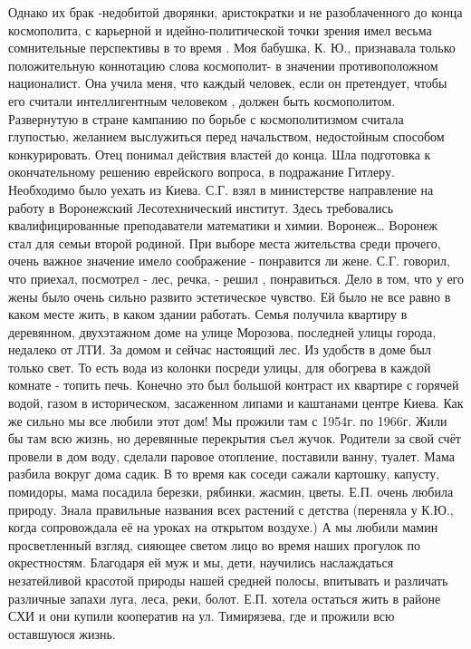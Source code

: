 Однако их брак -недобитой дворянки, аристократки и не разоблаченного до конца космополита, с карьерной и идейно-политической точки зрения имел весьма сомнительные перспективы в то время . Моя бабушка, К. Ю., признавала только положительную коннотацию слова космополит- в значении противоположном националист. Она учила меня, что каждый человек, если он претендует, чтобы его считали интеллигентным человеком , должен быть космополитом. Развернутую в стране кампанию по борьбе с космополитизмом считала глупостью, желанием выслужиться перед начальством, недостойным способом конкурировать. Отец понимал действия властей до конца. Шла подготовка к окончательному решению еврейского вопроса, в подражание Гитлеру. Необходимо было уехать из Киева. С.Г. взял в министерстве направление на работу в Воронежский Лесотехнический институт. Здесь требовались квалифицированные преподаватели математики и химии.
Воронеж…
Воронеж стал для семьи второй родиной. При выборе места жительства среди прочего, очень важное значение имело соображение - понравится ли жене. С.Г. говорил, что приехал, посмотрел - лес, речка, - решил , понравиться. Дело в том, что у его жены было очень сильно развито эстетическое чувство. Ей было не все равно в каком месте жить, в каком здании работать.
Семья получила квартиру в деревянном, двухэтажном доме на улице Морозова, последней улицы города, недалеко от ЛТИ. За домом и сейчас настоящий лес. Из удобств в доме был только свет. То есть вода из колонки посреди улицы, для обогрева в каждой комнате - топить печь. Конечно это был большой контраст их квартире с горячей водой, газом в историческом, засаженном липами и каштанами центре Киева.
Как же сильно мы все любили этот дом! Мы прожили там с 1954г. по 1966г. Жили бы там всю жизнь, но деревянные перекрытия съел жучок. Родители за свой счёт провели в дом воду, сделали паровое отопление, поставили ванну, туалет. Мама разбила вокруг дома садик. В то время как соседи сажали картошку, капусту, помидоры, мама посадила березки, рябинки, жасмин, цветы.
Е.П. очень любила природу. Знала правильные названия всех растений с детства (переняла у К.Ю., когда сопровождала её на уроках на открытом воздухе.) А мы любили мамин просветленный взгляд, сияющее светом лицо во время наших прогулок по окрестностям. Благодаря ей муж и мы, дети, научились наслаждаться незатейливой красотой природы нашей средней полосы, впитывать и различать различные запахи луга, леса, реки, болот.
Е.П. хотела остаться жить в районе СХИ и они купили кооператив на ул. Тимирязева, где и прожили всю оставшуюся жизнь.
